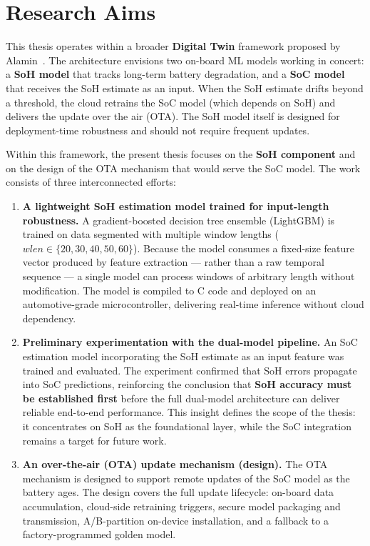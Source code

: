 \section{Research Aims}

This thesis operates within a broader \textbf{Digital Twin} framework proposed by Alamin~\autocite{Alamin2022}. The architecture envisions two on-board ML models working in concert: a \textbf{SoH model} that tracks long-term battery degradation, and a \textbf{SoC model} that receives the SoH estimate as an input. When the SoH estimate drifts beyond a threshold, the cloud retrains the SoC model (which depends on SoH) and delivers the update over the air (OTA). The SoH model itself is designed for deployment-time robustness and should not require frequent updates.

Within this framework, the present thesis focuses on the \textbf{SoH component} and on the design of the OTA mechanism that would serve the SoC model. The work consists of three interconnected efforts:

\begin{enumerate}
    \item \textbf{A lightweight SoH estimation model trained for input-length robustness.} A gradient-boosted decision tree ensemble (LightGBM) is trained on data segmented with multiple window lengths ($wlen \in \{20, 30, 40, 50, 60\}$). Because the model consumes a fixed-size feature vector produced by feature extraction --- rather than a raw temporal sequence --- a single model can process windows of arbitrary length without modification. The model is compiled to C code and deployed on an automotive-grade microcontroller, delivering real-time inference without cloud dependency.

    \item \textbf{Preliminary experimentation with the dual-model pipeline.} An SoC estimation model incorporating the SoH estimate as an input feature was trained and evaluated. The experiment confirmed that SoH errors propagate into SoC predictions, reinforcing the conclusion that \textbf{SoH accuracy must be established first} before the full dual-model architecture can deliver reliable end-to-end performance. This insight defines the scope of the thesis: it concentrates on SoH as the foundational layer, while the SoC integration remains a target for future work.

    \item \textbf{An over-the-air (OTA) update mechanism (design).} The OTA mechanism is designed to support remote updates of the SoC model as the battery ages. The design covers the full update lifecycle: on-board data accumulation, cloud-side retraining triggers, secure model packaging and transmission, A/B-partition on-device installation, and a fallback to a factory-programmed golden model.
\end{enumerate}

